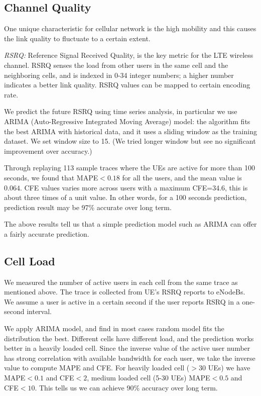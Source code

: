 \subsection{Channel Quality}\label{subsec:CQ}
One unique characteristic for cellular network is the high mobility and this causes the link quality to fluctuate to a certain extent.

\emph{RSRQ:} Reference Signal Received Quality, is the key metric for the LTE wireless channel. RSRQ senses the load from other users in the same cell and the neighboring cells, and is indexed in 0-34 integer numbers; a higher number indicates a better link quality. RSRQ values can be mapped to certain encoding rate.

We predict the future RSRQ using time series analysis, in particular we use ARIMA (Auto-Regressive Integrated Moving Average) model: the algorithm fits the best ARIMA with historical data, and it uses a sliding window as the training dataset. We set window size to 15. (We tried longer window but see no significant improvement over accuracy.) 

Through replaying 113 sample traces where the UEs are active for more than 100 seconds, we found that MAPE$<0.18$ for all the users, and the mean value is $0.064$. CFE values varies more across users with a maximum CFE=34.6, this is about three times of a unit value. In other words, for a 100 seconds prediction, prediction result may be 97\% accurate over long term. 

The above results tell us that a simple prediction model such as ARIMA can offer a fairly accurate prediction. 

\subsection{Cell Load}\label{subsec:NUser}
We measured the number of active users in each cell from the same trace as mentioned above. The trace is collected from UE's RSRQ reports to eNodeBs. We assume a user is active in a certain second if the user reports RSRQ in a one-second interval. 

We apply ARIMA model, and find in most cases random model fits the distribution the best. Different cells have different load, and the prediction works better in a heavily loaded cell. Since the inverse value of the active user number has strong correlation with available bandwidth for each user, we take the inverse value to compute MAPE and CFE. For heavily loaded cell ($>30$ UEs) we have MAPE$<0.1$ and CFE$<2$, medium loaded cell (5-30 UEs) MAPE$<0.5$ and CFE$<10$. This tells us we can achieve 90\% accuracy over long term. 



